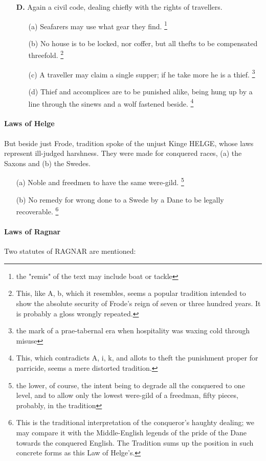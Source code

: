 \documentclass[10pt,a4paper]{report}
\begin{document}
\begin{itemize}
\item[\textbf{\large{D.}}] Again a civil code, dealing chiefly with the rights of travellers.
\begin{itemize}
\item[(a)] Seafarers may use what gear they find. \footnote{the "remis" of the text may include boat or tackle}
\item[(b)] No house is to be locked, nor coffer, but all thefts to be compensated threefold. \footnote{This, like A, b, which it resembles, seems a popular tradition intended to show the absolute security of Frode's reign of seven or three hundred years. It is probably a gloss wrongly repeated.}
\item[(c)] A traveller may claim a single supper; if he take more he is a thief. \footnote{the mark of a prae-tabernal era when hospitality was waxing cold through misuse}
\item[(d)] Thief and accomplices are to be punished alike, being hung up by a line through the sinews and a wolf fastened beside. \footnote{This, which contradicts A, i, k, and allots to theft the punishment proper for parricide, seems a mere distorted tradition.}
\end{itemize}

\end{itemize}
\paragraph*{Laws of Helge}
But beside just Frode, tradition spoke of the unjust Kinge HELGE, whose laws represent ill-judged harshness. They were made for conquered races, (a) the Saxons and (b) the Swedes.

\begin{itemize}
\item[(a)] Noble and freedmen to have the same were-gild. \footnote{the lower, of course, the intent being to degrade all the conquered to one level, and to allow only the lowest were-gild of a freedman, fifty pieces, probably, in the tradition}
\item[(b)] No remedy for wrong done to a Swede by a Dane to be legally recoverable. \footnote{This is the traditional interpretation of the conqueror's haughty dealing; we may compare it with the Middle-English legends of the pride of the Dane towards the conquered English. The Tradition sums up the position in such concrete forms as this Law of Helge's.}
\end{itemize}

\paragraph*{Laws of Ragnar}
Two statutes of RAGNAR are mentioned:
\end{document}
